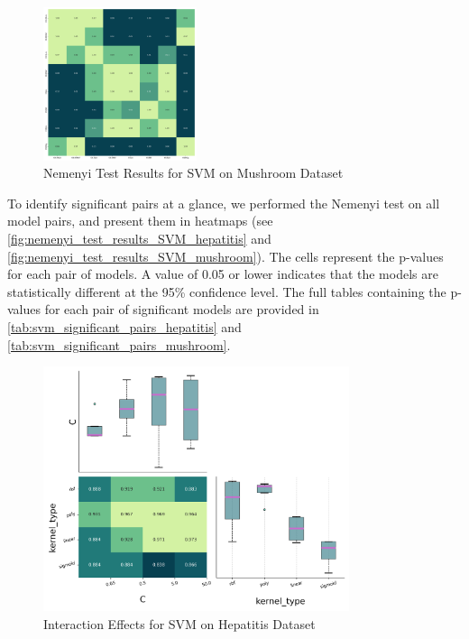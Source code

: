 \begin{figure}
    \centering
    \includegraphics[width=0.4\textwidth]{figures/nemenyi_test_results_SVM_mushroom.png}
    \caption{Nemenyi Test Results for SVM on Mushroom Dataset}
    \label{fig:nemenyi_test_results_SVM_mushroom}
\end{figure}

To identify significant pairs at a glance, we performed the Nemenyi test on all model pairs,
and present them in heatmaps (see \autoref{fig:nemenyi_test_results_SVM_hepatitis} and \autoref{fig:nemenyi_test_results_SVM_mushroom}).
The cells represent the p-values for each pair of models. A value of 0.05 or lower indicates that the models are statistically different
at the 95\% confidence level. The full tables containing the p-values for each pair of significant models are provided in \autoref{tab:svm_significant_pairs_hepatitis} and \autoref{tab:svm_significant_pairs_mushroom}.




\begin{figure}
    \centering
    \includegraphics[width=0.8\textwidth]{figures/interaction_effects_SVM_hepatitis.png}
    \caption{Interaction Effects for SVM on Hepatitis Dataset}
    \label{fig:interaction_effects_SVM_hepatitis}
\end{figure}


